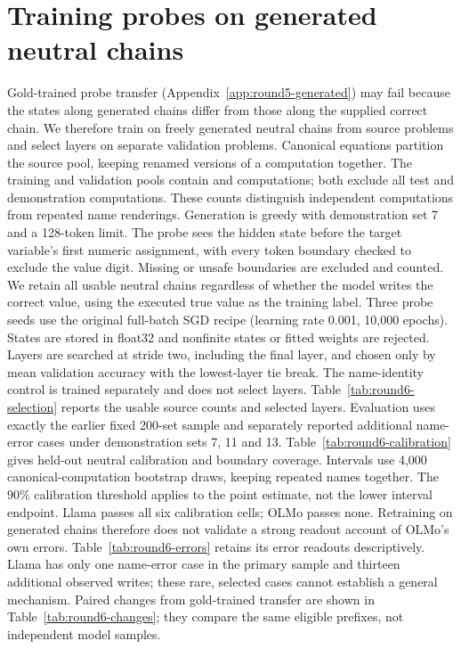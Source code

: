 \newsavebox{\roundsixbox}
\section{Training probes on generated neutral chains}
\label{app:round6-generated}

Gold-trained probe transfer (Appendix~\ref{app:round5-generated}) may fail because the states along generated chains differ from those along the supplied correct chain. We therefore train on freely generated neutral chains from  source problems and select layers on  separate validation problems. Canonical equations partition the source pool, keeping renamed versions of a computation together. The training and validation pools contain  and  computations; both exclude all test and demonstration computations. These counts distinguish independent computations from repeated name renderings.
Generation is greedy with demonstration set 7 and a 128-token limit. The probe sees the hidden state before the target variable's first numeric assignment, with every token boundary checked to exclude the value digit. Missing or unsafe boundaries are excluded and counted. We retain all usable neutral chains regardless of whether the model writes the correct value, using the executed true value as the training label. Three probe seeds use the original full-batch SGD recipe (learning rate 0.001, 10,000 epochs). States are stored in float32 and nonfinite states or fitted weights are rejected. Layers are searched at stride two, including the final layer, and chosen only by mean validation accuracy with the lowest-layer tie break. The name-identity control is trained separately and does not select layers.
Table~\ref{tab:round6-selection} reports the usable source counts and selected layers. Evaluation uses exactly the earlier fixed 200-set sample and separately reported additional name-error cases under demonstration sets 7, 11 and 13. Table~\ref{tab:round6-calibration} gives held-out neutral calibration and boundary coverage. Intervals use 4,000 canonical-computation bootstrap draws, keeping repeated names together. The 90\% calibration threshold applies to the point estimate, not the lower interval endpoint.
Llama passes all six calibration cells; OLMo passes none. Retraining on generated chains therefore does not validate a strong readout account of OLMo's own errors. Table~\ref{tab:round6-errors} retains its error readouts descriptively. Llama has only one name-error case in the primary sample and thirteen additional observed writes; these rare, selected cases cannot establish a general mechanism. Paired changes from gold-trained transfer are shown in Table~\ref{tab:round6-changes}; they compare the same eligible prefixes, not independent model samples.
